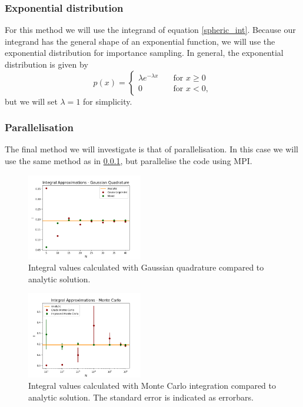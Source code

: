 \documentclass[notitlepage, reprint, nofootinbib]{revtex4-1}
\begin{document}
\subsubsection{Exponential distribution}\label{exp_distr}
For this method we will use the integrand of equation \ref{spheric_int}. Because our integrand has the general shape of an exponential function, we will use the exponential distribution for importance sampling. In general, the exponential distribution is given by
\begin{equation}\label{exp_dist} p(x)=\begin{cases}\lambda e^{-\lambda x} \quad  &\text{for $x\geq 0$}\\ 0\quad &\text{for $x<0$},\end{cases}\end{equation}
but we will set $\lambda=1$ for simplicity. 

\subsubsection{Parallelisation}
The final method we will investigate is that of parallelisation. In this case we will use the same method as in \ref{exp_distr}, but parallelise the code using MPI\cite{MPI}. 
\newpage
\begin{figure}[h!]
	\centering
	\includegraphics[width=0.45\textwidth]{../Figures/QC_quadrature.png}
	\caption{Integral values calculated with Gaussian quadrature compared to analytic solution. }
	\label{res1}
\end{figure}
\begin{figure}[h!]
	\centering
	\includegraphics[width=0.45\textwidth]{../Figures/MC.png}
	\caption{Integral values calculated with Monte Carlo integration compared to analytic solution. The standard error is indicated as errorbars.}
	\label{res2}
\end{figure}
\end{document}
